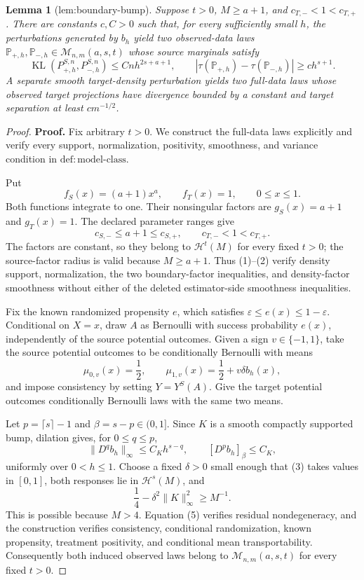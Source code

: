 \documentclass{article}
\newtheorem{lemma}{Lemma}
\begin{document}
\begin{lemma}[lem:boundary-bump]\label{lem:boundary-bump}
Suppose \(t>0\), \(M\ge a+1\), and \(c_{T,-}<1<c_{T,+}\). There are constants \(c,C>0\) such that, for every sufficiently small \(h\), the perturbations generated by \(b_h\) yield two observed-data laws \(\mathbb P_{+,h},\mathbb P_{-,h}\in\mathcal M_{n,m}(a,s,t)\) whose source marginals satisfy \[\operatorname{KL}(P_{+,h}^{S,n},P_{-,h}^{S,n})\le Cnh^{2s+a+1},\qquad |\tau(\mathbb P_{+,h})-\tau(\mathbb P_{-,h})|\ge ch^{s+1}.\] A separate smooth target-density perturbation yields two full-data laws whose observed target projections have divergence bounded by a constant and target separation at least \(cm^{-1/2}\).
\end{lemma}
\begin{proof}
\textbf{Proof.}
Fix arbitrary \(t>0\). We construct the full-data laws explicitly and verify every support, normalization, positivity, smoothness, and variance condition in \(\mathrm{def:model\text{-}class}\).

Put
\[
f_S(x)=(a+1)x^a,
\qquad
f_T(x)=1,
\qquad 0\le x\le1.
\tag{1}
\]
Both functions integrate to one. Their nonsingular factors are \(g_S(x)=a+1\) and \(g_T(x)=1\). The declared parameter ranges give
\[
c_{S,-}\le a+1\le c_{S,+},
\qquad
c_{T,-}<1<c_{T,+}.
\tag{2}
\]
The factors are constant, so they belong to \(\mathcal H^t(M)\) for every fixed \(t>0\); the source-factor radius is valid because \(M\ge a+1\). Thus (1)--(2) verify density support, normalization, the two boundary-factor inequalities, and density-factor smoothness without either of the deleted estimator-side smoothness inequalities.

Fix the known randomized propensity \(e\), which satisfies \(\varepsilon\le e(x)\le1-\varepsilon\). Conditional on \(X=x\), draw \(A\) as Bernoulli with success probability \(e(x)\), independently of the source potential outcomes. Given a sign \(v\in\{-1,1\}\), take the source potential outcomes to be conditionally Bernoulli with means
\[
\mu_{0,v}(x)=\frac12,
\qquad
\mu_{1,v}(x)=\frac12+v\delta b_h(x),
\tag{3}
\]
and impose consistency by setting \(Y=Y^S(A)\). Give the target potential outcomes conditionally Bernoulli laws with the same two means.

Let \(p=\lceil s\rceil-1\) and \(\beta=s-p\in(0,1]\). Since \(K\) is a smooth compactly supported bump, dilation gives, for \(0\le q\le p\),
\[
\lVert D^q b_h\rVert_\infty\le C_Kh^{s-q},
\qquad
[D^p b_h]_{\beta}\le C_K,
\tag{4}
\]
uniformly over \(0<h\le1\). Choose a fixed \(\delta>0\) small enough that (3) takes values in \([0,1]\), both responses lie in \(\mathcal H^s(M)\), and
\[
\frac14-\delta^2\lVert K\rVert_\infty^2\ge M^{-1}.
\tag{5}
\]
This is possible because \(M>4\). Equation (5) verifies residual nondegeneracy, and the construction verifies consistency, conditional randomization, known propensity, treatment positivity, and conditional mean transportability. Consequently both induced observed laws belong to \(\mathcal M_{n,m}(a,s,t)\) for every fixed \(t>0\).


\end{proof}
\end{document}
